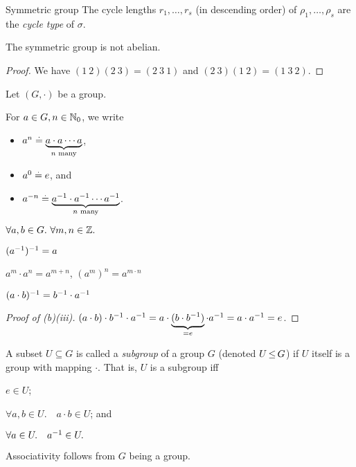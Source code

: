 \begin{ex}{Symmetric group}{}
The cycle lengths $r_1, \dots, r_s$ (in descending order) of $\rho_1, \dots, \rho_s$ are the \emph{cycle type} of $\sigma$.

\begin{rmk}
The symmetric group is not abelian.
\end{rmk}\vspace{-20pt}\begin{proof}
We have $(1\ 2)(2\ 3) = (2\ 3\ 1)$ and $(2\ 3)(1\ 2) = (1\ 3\ 2)$.
\end{proof}
\end{ex}

\begin{lem}
Let $(G,\cdot)$ be a group. \begin{lemlist}
    \item For $a \in G, n \in \mathbb{N}_0$, we write \begin{itemize}
        \item $a^n \overset{.}{=} \underbrace{a \cdot a \cdots a}_{\text{$n$ many}}$,
        \item $a^0 \overset{.}{=} e$, and
        \item $a^{-n} \overset{.}{=} \underbrace{a^{-1} \cdot a^{-1} \cdots a^{-1}}_{\text{$n$ many}}$.
    \end{itemize}
    
    \item $\forall a, b \in G.\ \forall m, n \in \mathbb{Z}.$ \begin{nestedlemlist}
        \item $(a^{-1})^{-1} = a$
        \item $a^m \cdot a^n = a^{m+n}$, $(a^m)^n = a^{m \cdot n}$
        \item $(a \cdot b)^{-1} = b^{-1} \cdot a^{-1}$
    \end{nestedlemlist}
\end{lemlist}
\end{lem}
\begin{proof}[Proof of (b)(iii)] $(a \cdot b) \cdot b^{-1} \cdot a^{-1} = a \cdot \underbrace{(b \cdot b^{-1})}_{=e} \cdot a^{-1} = a \cdot a^{-1} = e$.
\end{proof}

\begin{defn}[Subgroup]\label{defn:subgroup}
A subset $U \subseteq G$ is called a \emph{subgroup} of a group $G$ (denoted $U \operatorname*{\leq} G$) if $U$ itself is a group with mapping $\cdot$. That is, $U$ is a subgroup iff \begin{defnlist}
    \item $e \in U$; 
    \item $\forall a, b \in U.\quad a \cdot b \in U$; and 
    \item $\forall a \in U.\quad a^{-1} \in U.$ 
\end{defnlist} Associativity follows from $G$ being a group.
\end{defn}


